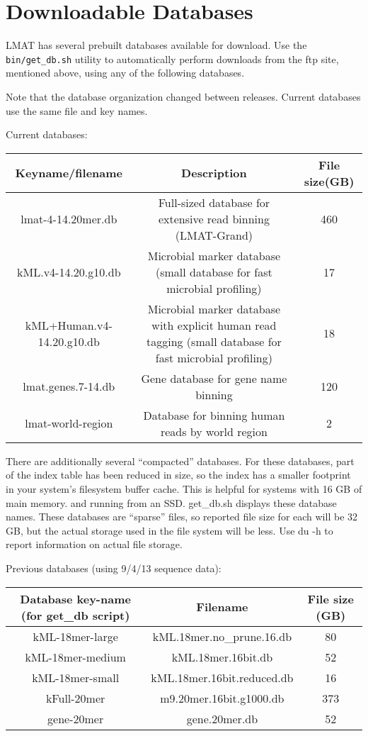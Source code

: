 \documentclass[11pt]{article}
\begin{document}
\section{Downloadable Databases}
\label{sec:downloads}


LMAT has several prebuilt databases available for download.  Use the \texttt{bin/get\_db.sh} utility to automatically perform downloads from the ftp site, mentioned above, using any of the following databases.  

Note that the database organization changed between releases.  Current databases use the same file and key names.  

Current databases:


\begin{tabular}{| c | c | c |}
\hline
Keyname/filename & Description & File size(GB) \\
\hline
lmat-4-14.20mer.db & Full-sized database for extensive read binning (LMAT-Grand) & 460 \\
\hline
kML.v4-14.20.g10.db & Microbial marker database (small database for fast microbial profiling) & 17 \\
\hline
kML+Human.v4-14.20.g10.db & Microbial marker database with explicit human read tagging (small database for fast microbial profiling) & 18 \\
\hline
lmat.genes.7-14.db & Gene database for gene name binning & 120 \\
\hline
lmat-world-region & Database for binning human reads by world region & 2 \\
\hline
\end{tabular}


There are additionally several ``compacted'' databases.  For these databases, part of the index table has been reduced in size, so the index has a smaller footprint in your system's filesystem buffer cache.  This is helpful for systems with 16 GB of main memory. and running from an SSD.  get\_db.sh displays these database names.  These databases are ``sparse'' files, so reported file size for each will be 32 GB, but the actual storage used in the file system will be less.  Use du -h to report information on actual file storage.


Previous databases (using 9/4/13 sequence data):

\begin{tabular}{| c | c | c |}
\hline
Database key-name (for get\_db script) & Filename & File size (GB) \\
\hline
kML-18mer-large & kML.18mer.no\_prune.16.db & 80 \\
\hline
kML-18mer-medium & kML.18mer.16bit.db  & 52 \\
\hline
kML-18mer-small & kML.18mer.16bit.reduced.db  & 16 \\
\hline
kFull-20mer & m9.20mer.16bit.g1000.db & 373 \\
\hline
gene-20mer & gene.20mer.db & 52 \\
\hline
\end{tabular}
\end{document}
